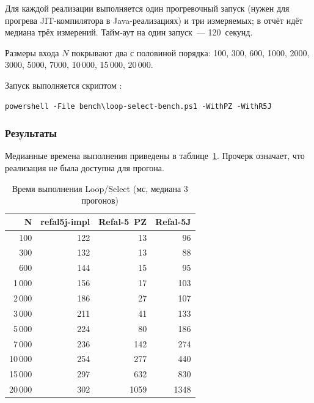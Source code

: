 Для каждой реализации выполняется один прогревочный запуск
(нужен для прогрева JIT-компилятора в Java-реализациях)
и три измеряемых; в отчёт идёт медиана трёх измерений.
Тайм-аут на один запуск~--- 120~секунд.

Размеры входа $N$ покрывают два с половиной порядка:
100, 300, 600, 1000, 2000, 3000, 5000, 7000,
10\,000, 15\,000, 20\,000.

Запуск выполняется скриптом :

\begin{longlisting}
\caption{Запуск бенчмарка Loop/Select}\label{lst:bench-run}
\begin{verbatim}
powershell -File bench\loop-select-bench.ps1 -WithPZ -WithR5J
\end{verbatim}
\end{longlisting}

\subsubsection{Результаты}

Медианные времена выполнения приведены в таблице~\ref{tab:bench-results}.
Прочерк означает, что реализация не была доступна для прогона.

\begin{table}[!htb]
\caption{\centering Время выполнения Loop/Select (мс, медиана 3 прогонов)}
\label{tab:bench-results}
\centering
\small
\begin{tabular}{@{}rrrr@{}}
\toprule
\textbf{N} & \textbf{refal5j-impl} & \textbf{Refal-5~PZ} & \textbf{Refal-5J} \\
\midrule
100    & 122  & 13   & 96   \\
300    & 132  & 13   & 88   \\
600    & 144  & 15   & 95   \\
1\,000 & 156  & 17   & 103  \\
2\,000 & 186  & 27   & 107  \\
3\,000 & 211  & 41   & 133  \\
5\,000 & 224  & 80   & 186  \\
7\,000 & 236  & 142  & 274  \\
10\,000 & 254 & 277  & 440  \\
15\,000 & 297 & 632  & 830  \\
20\,000 & 302 & 1059 & 1348 \\
\bottomrule
\end{tabular}
\end{table}

